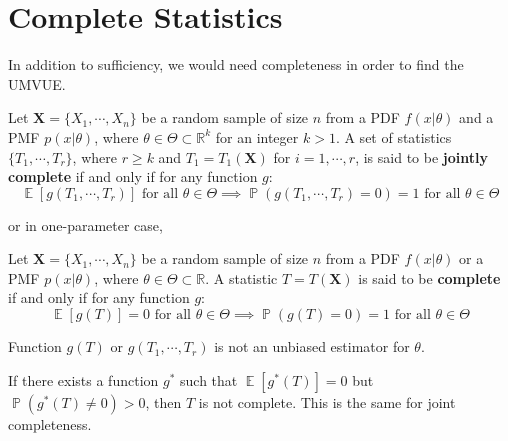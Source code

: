 \documentclass{huhtakm-template-book-v2}
\DeclareMathOperator{\prob}{\mathbb{P}}
\DeclareMathOperator{\E}{\mathbb{E}}
\begin{document}
\section{Complete Statistics}
In addition to sufficiency, we would need completeness in order to find the UMVUE.
\begin{defn}
	Let $\mathbf{X}=\{X_{1},\cdots,X_{n}\}$ be a random sample of size $n$ from a PDF $f(x|\theta)$ and a PMF $p(x|\theta)$, where $\theta\in\Theta\subset\mathbb{R}^{k}$ for an integer $k>1$. A set of statistics $\{T_{1},\cdots,T_{r}\}$, where $r\geq k$ and $T_{1}=T_{1}(\mathbf{X})$ for $i=1,\cdots,r$, is said to be \textbf{jointly complete} if and only if for any function $g$:
	\begin{equation*}
		\E[g(T_{1},\cdots,T_{r})]\text{ for all }\theta\in\Theta\implies\prob(g(T_{1},\cdots,T_{r})=0)=1\text{ for all }\theta\in\Theta
	\end{equation*}
\end{defn}
or in one-parameter case,
\begin{defn}
	Let $\mathbf{X}=\{X_{1},\cdots,X_{n}\}$ be a random sample of size $n$ from a PDF $f(x|\theta)$ or a PMF $p(x|\theta)$, where $\theta\in\Theta\subset\mathbb{R}$. A statistic $T=T(\mathbf{X})$ is said to be \textbf{complete} if and only if for any function $g$:
	\begin{equation*}
		\E[g(T)]=0\text{ for all }\theta\in\Theta\implies\prob(g(T)=0)=1\text{ for all }\theta\in\Theta
	\end{equation*} 
\end{defn}
\begin{rem}
	Function $g(T)$ or $g(T_{1},\cdots,T_{r})$ is not an unbiased estimator for $\theta$.
\end{rem}
\begin{rem}
	If there exists a function $g^{*}$ such that $\E[g^{*}(T)]=0$ but $\prob(g^{*}(T)\neq 0)>0$, then $T$ is not complete. This is the same for joint completeness. 
\end{rem}
\end{document}
